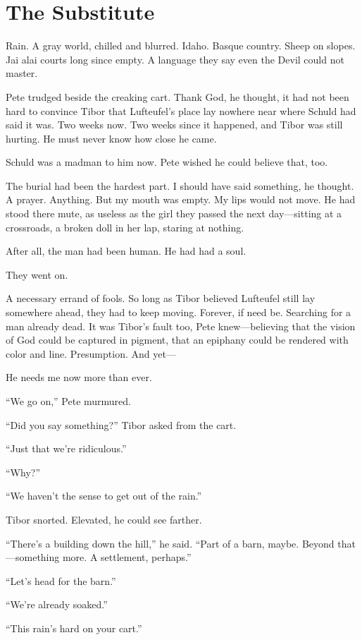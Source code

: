 \chapter{The Substitute}

Rain. A gray world, chilled and blurred. Idaho. Basque country. Sheep on slopes. Jai alai courts long since empty. A language they say even the Devil could not master.

Pete trudged beside the creaking cart. Thank God, he thought, it had not been hard to convince Tibor that Lufteufel’s place lay nowhere near where Schuld had said it was. Two weeks now. Two weeks since it happened, and Tibor was still hurting. He must never know how close he came.

Schuld was a madman to him now. Pete wished he could believe that, too.

The burial had been the hardest part. I should have said something, he thought. A prayer. Anything. But my mouth was empty. My lips would not move. He had stood there mute, as useless as the girl they passed the next day—sitting at a crossroads, a broken doll in her lap, staring at nothing.

After all, the man had been human. He had had a soul.

They went on.

A necessary errand of fools. So long as Tibor believed Lufteufel still lay somewhere ahead, they had to keep moving. Forever, if need be. Searching for a man already dead. It was Tibor’s fault too, Pete knew—believing that the vision of God could be captured in pigment, that an epiphany could be rendered with color and line. Presumption. And yet—

He needs me now more than ever.

“We go on,” Pete murmured.

“Did you say something?” Tibor asked from the cart.

“Just that we’re ridiculous.”

“Why?”

“We haven’t the sense to get out of the rain.”

Tibor snorted. Elevated, he could see farther.

“There’s a building down the hill,” he said. “Part of a barn, maybe. Beyond that—something more. A settlement, perhaps.”

“Let’s head for the barn.”

“We’re already soaked.”

“This rain’s hard on your cart.”

